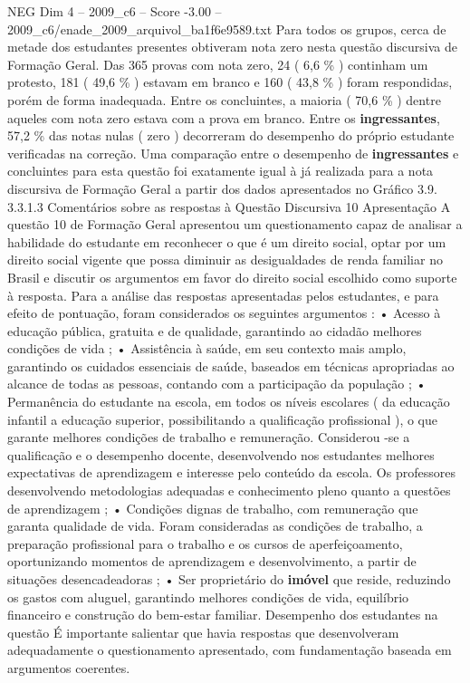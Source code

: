 \begin{textsample}{NEG Dim 4 – 2009\_c6 – Score -3.00 – 2009\_c6/enade\_2009\_arquivol\_ba1f6e9589.txt}
Para todos os grupos, cerca de metade dos estudantes presentes obtiveram nota zero nesta questão discursiva de Formação Geral.
Das 365 provas com nota zero, 24 ( 6,6 \% ) continham um protesto, 181 ( 49,6 \% ) estavam em branco e 160 ( 43,8 \% ) foram respondidas, porém de forma inadequada.
Entre os concluintes, a maioria ( 70,6 \% ) dentre aqueles com nota zero estava com a prova em branco.
Entre os \textbf{ingressantes}, 57,2 \% das notas nulas ( zero ) decorreram do desempenho do próprio estudante verificadas na correção.
Uma comparação entre o desempenho de \textbf{ingressantes} e concluintes para esta questão foi exatamente igual à já realizada para a nota discursiva de Formação Geral a partir dos dados apresentados no Gráfico 3.9. 3.3.1.3 Comentários sobre as respostas à Questão Discursiva 10 Apresentação A questão 10 de Formação Geral apresentou um questionamento capaz de analisar a habilidade do estudante em reconhecer o que é um direito social, optar por um direito social vigente que possa diminuir as desigualdades de renda familiar no Brasil e discutir os argumentos em favor do direito social escolhido como suporte à resposta.
Para a análise das respostas apresentadas pelos estudantes, e para efeito de pontuação, foram considerados os seguintes argumentos : • Acesso à educação pública, gratuita e de qualidade, garantindo ao cidadão melhores condições de vida ; • Assistência à saúde, em seu contexto mais amplo, garantindo os cuidados essenciais de saúde, baseados em técnicas apropriadas ao alcance de todas as pessoas, contando com a participação da população ; • Permanência do estudante na escola, em todos os níveis escolares ( da educação infantil a educação superior, possibilitando a qualificação profissional ), o que garante melhores condições de trabalho e remuneração.
Considerou -se a qualificação e o desempenho docente, desenvolvendo nos estudantes melhores expectativas de aprendizagem e interesse pelo conteúdo da escola.
Os professores desenvolvendo metodologias adequadas e conhecimento pleno quanto a questões de aprendizagem ; • Condições dignas de trabalho, com remuneração que garanta qualidade de vida.
Foram consideradas as condições de trabalho, a preparação profissional para o trabalho e os cursos de aperfeiçoamento, oportunizando momentos de aprendizagem e desenvolvimento, a partir de situações desencadeadoras ; • Ser proprietário do \textbf{imóvel} que reside, reduzindo os gastos com aluguel, garantindo melhores condições de vida, equilíbrio financeiro e construção do bem-estar familiar.
Desempenho dos estudantes na questão É importante salientar que havia respostas que desenvolveram adequadamente o questionamento apresentado, com fundamentação baseada em argumentos coerentes.

\end{textsample}
